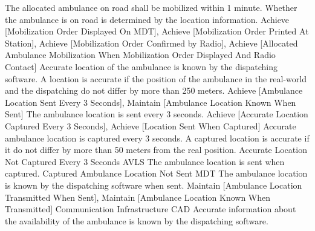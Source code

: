 	 {The allocated ambulance on road shall be mobilized within 1 minute. Whether the ambulance is on road is determined by the location information.}
	 {Achieve [Mobilization Order Displayed On MDT], Achieve [Mobilization Order Printed At Station], Achieve [Mobilization Order Confirmed by Radio], Achieve [Allocated Ambulance Mobilization When Mobilization Order Displayed And Radio Contact]}
\stopkaosspec
\startkaosspec
	 {Accurate location of the ambulance is known by the dispatching software. A location is accurate if the position of the ambulance in the real-world and the dispatching do not differ by more than 250 meters.}
	 {Achieve [Ambulance Location Sent Every 3 Seconds], Maintain [Ambulance Location Known When Sent]}
\stopkaosspec
\startkaosspec
	 {The ambulance location is sent every 3 seconds.}
	 {Achieve [Accurate Location Captured Every 3 Seconds], Achieve [Location Sent When Captured]}
\stopkaosspec
\startkaosspec
	 {Accurate ambulance location is captured every 3 seconds. A captured location is accurate if it do not differ by more than 50 meters from the real position.}
	 {Accurate Location Not Captured Every 3 Seconds}
	 {AVLS}
\stopkaosspec
\startkaosspec
	 {The ambulance location is sent when captured.}
	 {Captured Ambulance Location Not Sent}
	 {MDT}
\stopkaosspec
\startkaosspec
	 {The ambulance location is known by the dispatching software when sent.}
	 {Maintain [Ambulance Location Transmitted When Sent], Maintain [Ambulance Location Known When Transmitted]}
\stopkaosspec
\startkaosspec
	 {}
	 {Communication Infrastructure}
\stopkaosspec
\startkaosspec
	 {}
	 {CAD}
\stopkaosspec
\startkaosspec
	 {Accurate information about the availability of the ambulance is known by the dispatching software.}
